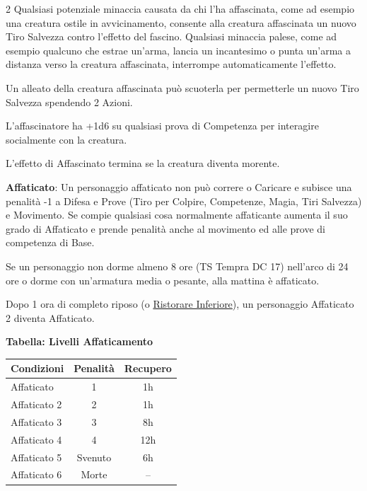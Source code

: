 \begin{multicols}{2}
Qualsiasi potenziale minaccia causata da chi l'ha affascinata, come ad esempio una creatura ostile in avvicinamento, consente alla creatura affascinata un nuovo Tiro Salvezza contro l'effetto del fascino. Qualsiasi minaccia palese, come ad esempio qualcuno che estrae un'arma, lancia un incantesimo o punta un'arma a distanza verso la creatura affascinata, interrompe automaticamente l'effetto.

Un alleato della creatura affascinata può scuoterla per permetterle un nuovo Tiro Salvezza spendendo 2 Azioni.

L'affascinatore ha +1d6 su qualsiasi prova di Competenza per interagire socialmente con la creatura.

L'effetto di Affascinato termina se la creatura diventa morente.

\textbf{Affaticato}\hypertarget{affaticato}{}\label{affaticato}: Un personaggio affaticato non può correre o Caricare e subisce una penalità -1 a Difesa e Prove (Tiro per Colpire, Competenze, Magia, Tiri Salvezza) e Movimento. Se compie qualsiasi cosa normalmente affaticante aumenta il suo grado di Affaticato e prende penalità anche al movimento ed alle prove di competenza di Base.

Se un personaggio non dorme almeno 8 ore (TS Tempra DC 17) nell'arco di 24 ore o dorme con un'armatura media o pesante, alla mattina è affaticato.

Dopo 1 ora di completo riposo (o \hyperlink{Ristorare Inferiore}{Ristorare Inferiore}), un personaggio Affaticato 2 diventa Affaticato.

\medskip

\textbf{Tabella: Livelli Affaticamento}

\medskip

\noindent\begin{tabularx}{\linewidth}{Xcc}
	\toprule
\rowcolor{gray!20}\textbf{Condizioni}& \textbf{Penalità}&\textbf{Recupero}\\
\toprule
Affaticato 		&	1 		&	1h\\
\rowcolor{gray!20}Affaticato 2	&	2		&	1h\\
Affaticato 3	&	3		&	8h\\
\rowcolor{gray!20}Affaticato 4	&	4		&	12h\\
Affaticato 5	&	Svenuto	&	6h\\
\rowcolor{gray!20}Affaticato 6	&	Morte	&	--
\end{tabularx}


\end{multicols}
